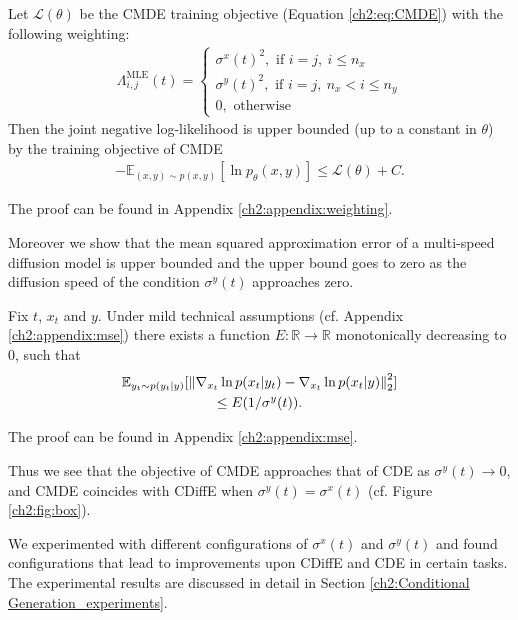 \begin{theorem}
    \label{ch2:thm:weightning}
    Let $\mathcal{L}(\theta)$ be the CMDE training objective (Equation \ref{ch2:eq:CMDE}) with the following weighting:
    \begin{gather*}
        \Lambda^{\text{MLE}}_{i,j}(t) =  
        \begin{cases} 
            \sigma^x(t)^2, \text{ if } i=j, \ i \leq n_x \\ 
            \sigma^y(t)^2, \text{ if } i=j, \ n_x < i \leq n_y  \\
            0, \text{ otherwise}
        \end{cases}            
    \end{gather*}
    Then the joint negative log-likelihood is upper bounded (up to a constant in $\theta$) by the training objective of CMDE
    \begin{gather*}
        -\mathbb{E}_{(x,y) \sim p(x,y)}[\ln p_\theta(x,y)] \leq \mathcal{L}(\theta) + C.
    \end{gather*}
\noindent
\end{theorem}

\noindent
The proof can be found in Appendix \ref{ch2:appendix:weighting}. 

Moreover we show that the mean squared approximation error of a multi-speed diffusion model is upper bounded and the upper bound goes to zero as the diffusion speed of the condition $\sigma^y(t)$ approaches zero.
\begin{theorem}
    Fix $t$, $x_t$ and $y$. Under mild technical assumptions (cf. Appendix \ref{ch2:appendix:mse}) there exists a function  $E: \mathbb{R} \xrightarrow{} \mathbb{R}$ monotonically decreasing to $0$, such that
    \begin{gather*}
        \mathbb{E}_{y_t \sim p(y_t|y)}[
            \left\lVert  \nabla_{x_t} \ln p(x_t|y_t) - \nabla_{x_t} \ln p(x_t|y) \right\rVert_2^2
            ] \\
            \leq E(1/\sigma^y(t)).
    \end{gather*}
\end{theorem}
\noindent
The proof can be found in Appendix \ref{ch2:appendix:mse}.

Thus we see that the objective of CMDE approaches that of CDE as  $\sigma^y(t) \to 0$, and  CMDE coincides with CDiffE when $ \sigma^y(t) = \sigma^x(t)$ (cf. Figure \ref{ch2:fig:box}).

We experimented with different configurations of $\sigma^x(t)$ and $\sigma^y(t)$ and found configurations that lead to  improvements upon CDiffE and  CDE in certain tasks. The experimental results are discussed in detail in Section \ref{ch2:Conditional Generation_experiments}.


